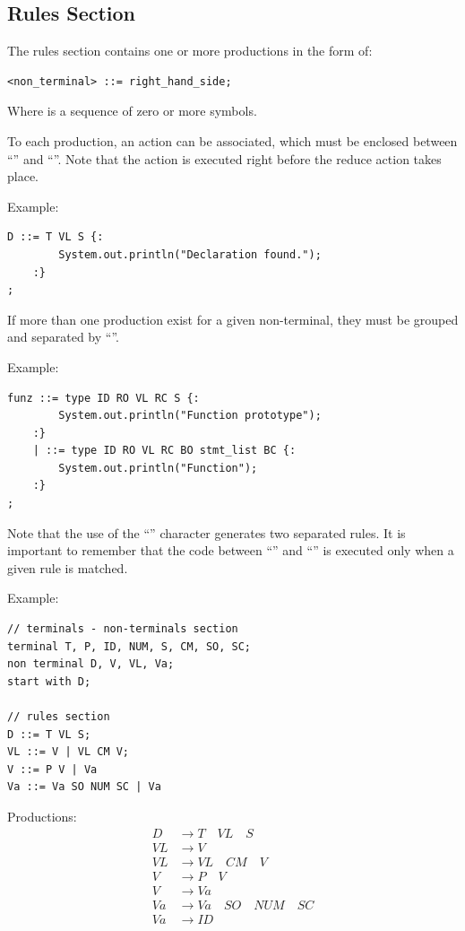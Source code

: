 \subsection{Rules Section}
The rules section contains one or more productions in the form of:
\begin{lstlisting}
<non_terminal> ::= right_hand_side;
\end{lstlisting}
Where  is a sequence of zero or more symbols.

To each production, an action can be associated, which must be enclosed between ``\code{\{:}'' and ``\code{:\}}''.
Note that the action is executed right before the reduce action takes place.

Example:
\begin{lstlisting}
D ::= T VL S {:
        System.out.println("Declaration found.");
    :}
;
\end{lstlisting}

If more than one production exist for a given non-terminal, they must be grouped and separated by ``\code{\|}''.

Example:
\begin{lstlisting}
funz ::= type ID RO VL RC S {:
        System.out.println("Function prototype");
    :}
    | ::= type ID RO VL RC BO stmt_list BC {:
        System.out.println("Function");
    :}
;
\end{lstlisting}
Note that the use of the ``\code{\|}'' character generates two separated rules.
It is important to remember that the code between ``\code{\{:}'' and ``\code{:\}}'' is executed only when a given rule is matched.

Example:
\begin{lstlisting}
// terminals - non-terminals section
terminal T, P, ID, NUM, S, CM, SO, SC;
non terminal D, V, VL, Va;
start with D;

// rules section
D ::= T VL S;
VL ::= V | VL CM V;
V ::= P V | Va
Va ::= Va SO NUM SC | Va
\end{lstlisting}
Productions:
\begin{align*}
    D &\to T \quad VL \quad S \\
    VL &\to V \\
    VL &\to VL \quad CM \quad V \\
    V &\to P \quad V \\
    V &\to Va \\
    Va &\to Va \quad SO \quad NUM \quad SC \\
    Va &\to ID
\end{align*}


